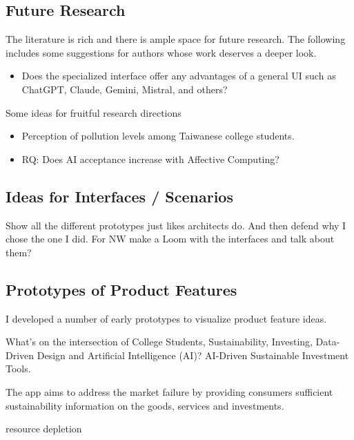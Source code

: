 \documentclass[
  letterpaper,
  DIV=11,
  numbers=noendperiod]{scrartcl}
\providecommand{\tightlist}{%
  \setlength{\itemsep}{0pt}\setlength{\parskip}{0pt}}\usepackage{longtable,booktabs,array}
\begin{document}
\subsection{Future Research}\label{future-research}

The literature is rich and there is ample space for future research. The
following includes some suggestions for authors whose work deserves a
deeper look.

\begin{itemize}
\tightlist
\item
  Does the specialized interface offer any advantages of a general UI
  such as ChatGPT, Claude, Gemini, Mistral, and others?
\end{itemize}

Some ideas for fruitful research directions

\begin{itemize}
\item
  Perception of pollution levels among Taiwanese college students.
\item
  RQ: Does AI acceptance increase with Affective Computing?
\end{itemize}

\newpage

\subsection{Ideas for Interfaces /
Scenarios}\label{ideas-for-interfaces-scenarios}

Show all the different prototypes just likes architects do. And then
defend why I chose the one I did. For NW make a Loom with the interfaces
and talk about them?

\subsection{Prototypes of Product
Features}\label{prototypes-of-product-features}

I developed a number of early prototypes to visualize product feature
ideas.

What's on the intersection of College Students, Sustainability,
Investing, Data-Driven Design and Artificial Intelligence (AI)?
AI-Driven Sustainable Investment Tools.

The app aims to address the market failure by providing consumers
sufficient sustainability information on the goods, services and
investments.

resource depletion
\end{document}

